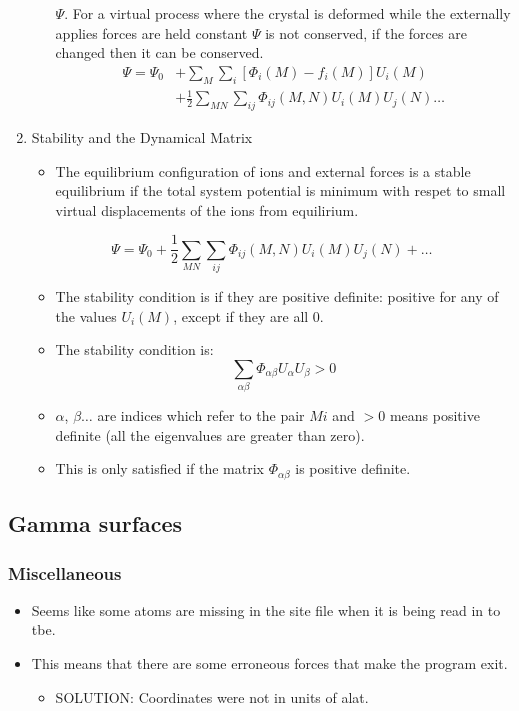 \documentclass[11pt]{article}
\begin{document}
\begin{enumerate}
\begin{itemize}
$\Psi$. For a virtual process where the crystal is deformed while the
externally applies forces are held constant $\Psi$ is not conserved, if
the forces are changed then it can be conserved. 
\begin{align}
\Psi = \Psi_{0} &+ \sum_{M}\sum_{i}[\Phi_{i}(M) - f_i(M)]U_{i}(M)\\
     &+ \frac{1}{2}\sum_{MN}\sum_{ij}\Phi_{ij}(M,N)U_i(M)U_j(N) \dots
\end{align}
\end{itemize}
\item Stability and the Dynamical Matrix
\label{sec-2-3-1-2}
\begin{itemize}
\item The equilibrium configuration of ions and external forces is a stable
equilibrium if the total system potential is minimum with respet to
small virtual displacements of the ions from equilirium.
\end{itemize}
\[\Psi = \Psi_{0}+
     \frac{1}{2}\sum_{MN}\sum_{ij}\Phi_{ij}(M,N)U_i(M)U_j(N) + \dots \]
\begin{itemize}
\item The stability condition is if they are positive definite: positive for
any of the values $U_{i}(M)$, except if they are all 0.
\item The stability condition is:
\[ \sum_{\alpha \beta} \Phi_{\alpha\beta}U_{\alpha}U_{\beta} > 0 \]
\item $\alpha$, $\beta \dots$ are indices which refer to the pair  $Mi$ and
$>0$ means positive definite (all the eigenvalues are greater than zero).
\item This is only satisfied if the matrix $\Phi_{\alpha\beta}$ is positive definite.
\end{itemize}
\end{enumerate}
\subsection{Gamma surfaces}
\label{sec-2-4}
\subsubsection{Miscellaneous}
\label{sec-2-4-1}
\begin{itemize}
\item Seems like some atoms are missing in the site file when it is being read
in to tbe.
\item This means that there are some erroneous forces that make the program
exit.
\begin{itemize}
\item SOLUTION: Coordinates were not in units of alat.
\end{itemize}
\end{itemize}
\end{document}
